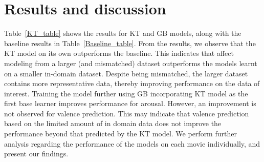 \documentclass{article}
\begin{document}
\section{Results and discussion}
\label{sec:res}
Table~\ref{KT_table} shows the results for KT and GB models, along with the baseline results in Table~\ref{Baseline_table}.
From the results, we observe that the KT model on its own outperforms the baseline.
This indicates that affect modeling from a larger (and mismatched) dataset outperforms the models learnt on a smaller in-domain dataset.
Despite being mismatched, the larger dataset contains more representative data, thereby improving performance on the data of interest. 
Training the model further using GB incorporating KT model as the first base learner improves performance for arousal. 
However, an improvement is not observed for valence prediction.
This may indicate that valence prediction based on the limited amount of in domain data does not improve the performance beyond that predicted by the KT model.
We perform further analysis regarding the performance of the models on each movie individually, and present our findings. 

\end{document}
